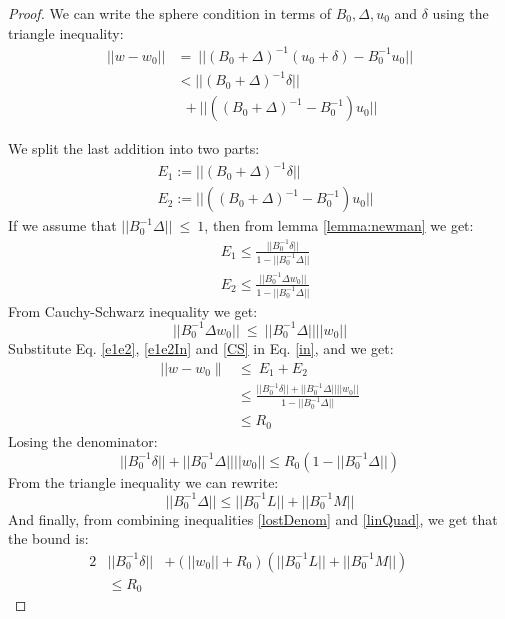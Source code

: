 \documentclass[11pt,twocolumn,varwidth=true,a4paper,fleqn]{article}
\begin{document}
\begin{proof}
We can write the sphere condition in terms of $B_0, \Delta, u_0$ and $\delta$ using the triangle
inequality:
\begin{equation} \label{in}
\begin{split}
||w-w_0|| & = \ ||(B_0+\Delta)^{-1}(u_0+\delta) - B_0^{-1}u_0|| \\
& < ||(B_0+\Delta)^{-1}\delta|| \\
& \ \ + ||((B_0+\Delta)^{-1} - B_0^{-1})u_0||
\end{split}
\end{equation}

We split the last addition into two parts:
\begin{equation}  \label{e1e2}
\begin{split}
& E_1:= ||(B_0+\Delta)^{-1}\delta|| \\
& E_2:= ||((B_0+\Delta)^{-1} - B_0^{-1})u_0||
\end{split}
\end{equation}
If we assume that $||B_0^{-1}\Delta||\ \leq \ 1$, 
then from lemma \ref{lemma:newman} we get:
\begin{equation} \label{e1e2In}
\begin{split}
& E_1 \leq \frac{||B_0^{-1}\delta||}{1-||B_0^{-1}\Delta||} \\
& E_2 \leq  \frac{|| B_0^{-1}\Delta w_0||}{1-||B_0^{-1}\Delta||}
\end{split}
\end{equation}
From Cauchy-Schwarz inequality we get:
\begin{equation} \label{CS}
||B_0^{-1}\Delta w_0|| \ \leq \ ||B_0^{-1}\Delta||||w_0||
\end{equation}
Substitute Eq. \ref{e1e2}, \ref{e1e2In} and \ref{CS} in Eq. \ref{in}, and we
get:
\begin{equation}
\begin{split}
|| w-w_0 \parallel & \leq \ E_1+E_2 \\
& \leq \frac{||B_0^{-1}\delta|| + ||B_0^{-1}\Delta||||w_0||}{1 -||B_0^{-1}\Delta||} \\
& \leq R_0
\end{split}
\end{equation}
Losing the denominator:
\begin{equation} \label{lostDenom}
||B_0^{-1}\delta|| + ||B_0^{-1}\Delta||||w_0||
\leq R_0(1 -||B_0^{-1}\Delta||)
\end{equation}
From the triangle inequality we can rewrite:
\begin{equation} \label{linQuad}
||B_0^{-1}\Delta|| \leq ||B_0^{-1}L||+||B_0^{-1}M||
\end{equation}
And finally, from combining inequalities \ref{lostDenom} and \ref{linQuad},
we get that the bound is:
\begin{alignat*}{2} \label{convexBound}
&||B_0^{-1}\delta|| &+ (||w_0||+R_0)(||B_0^{-1}L||+||B_0^{-1}M||) && \\ 
& \leq R_0 &&
\end{alignat*}
\end{proof}
\end{document}
